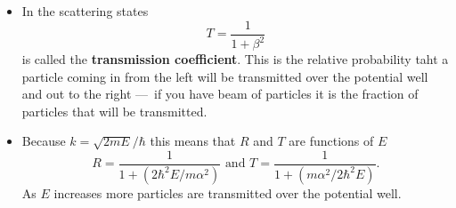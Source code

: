\documentclass{article}
\begin{document}
\begin{itemize}
  \item In the scattering states \[T = \frac{1}{1 + \beta^2}\] is called the \textbf{transmission coefficient}. This is the relative probability taht a particle coming in from the left will be transmitted over the potential well and out to the right — if you have beam of particles it is the fraction of particles that will be transmitted.

  \item Because $k = \sqrt{2 m E} / \hbar$ this means that $R$ and $T$ are functions of $E$ \[R = \frac{1}{1 + (2 \hbar^2 E / m \alpha^2)} \text{ and } T = \frac{1}{1 + (m \alpha^2 / 2 \hbar^2 E)}.\] As $E$ increases more particles are transmitted over the potential well.
\end{itemize}
\end{document}
